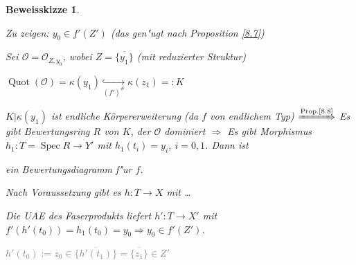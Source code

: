 \documentclass[paper = A4, fontsize=12pt, numbers=noendperiod, chapterprefix=true]{scrbook}
\theoremstyle{break}
\theoremstyle{nonumberbreak}
\newtheorem{bewskiz}{Beweisskizze}
\theoremstyle{nonumberplain}
\newcommand{\quot}[1]{\textrm{\glqq}{#1}\textrm{\grqq}}
\newenvironment{twosidedproof}{\begin{enumerate}[\quot{$\Rightarrow$}:]}{\end{enumerate}}
\DeclareMathOperator{\Quot}{Quot}
\DeclareMathOperator{\Spec}{Spec}
\newcommand{\calO}{\mathcal{O}}
\begin{document}
\begin{bewskiz}
\begin{enumerate}[I)]
\begin{twosidedproof}
		\emph{Zu zeigen:} $y_0 \in f'(Z')$ (das gen"ugt nach Proposition \ref{8.7})
		
		Sei $\calO = \calO_{Z, y_0}$, wobei $Z = \overline{\{y_1\}}$ (mit reduzierter Struktur)
		
		$\Quot(\calO) = \kappa(y_1) \underset{(f')^\#}{\hookrightarrow} \kappa(z_1) =: K$
		
		$K|\kappa(y_1)$ ist endliche K\"orpererweiterung (da $f$ von endlichem Typ) $\xRightarrow{\text{Prop.\ref{8.8}}}$ Es gibt Bewertungsring $R$ von $K$, der $\calO$ dominiert $\Rightarrow$ Es gibt Morphismus $h_1: T = \Spec R \to Y'$ mit $h_1(t_i) = y_i$, $i=0,1$. Dann ist
			\begin{center}\end{center}
		ein Bewertungsdiagramm f"ur $f$.
		
		Nach Voraussetzung gibt es $h: T \to X$ mit \ldots
		
		Die UAE des Faserprodukts liefert $h': T \to X'$ mit $f'(h'(t_0)) = h_1(t_0) = y_0 \Rightarrow y_0 \in f'(Z')$.
		
		\textcolor{gray}{$h'(t_0) := z_0 \in \overline{\{h'(t_1)\}} = \overline{\{z_1\}} \in Z'$}
\end{twosidedproof}\end{enumerate}\end{bewskiz}
\end{document}
